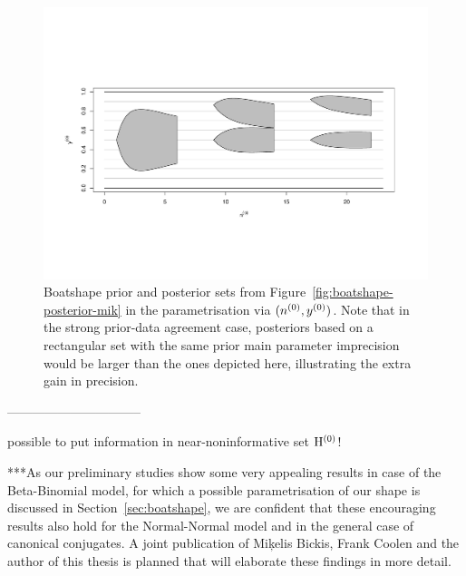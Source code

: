 \begin{figure}  %
\centering
\includegraphics[trim = 15mm 45mm 25mm 60mm, clip, width=\textwidth]{R/boatshape-posterior-normal}
\caption[Boatshape prior and posterior sets from Figure~\ref{fig:boatshape-posterior-mik} in the parametrisation via $(\nz,\yz)$.]%
{Boatshape prior and posterior sets from Figure~\ref{fig:boatshape-posterior-mik} in the parametrisation via $(\nz,\yz)$.
Note that in the strong prior-data agreement case,
posteriors based on a rectangular set with the same prior main parameter imprecision
would be larger than the ones depicted here, illustrating the extra gain in precision.}
\label{fig:boatshape-posterior-normal}
\end{figure}


--------------------------------


possible to put information in near-noninformative set $\mathrm{H}^{(0)}$!

***As our preliminary studies show some very appealing results in case of the Beta-Binomial model,
for which a possible parametrisation of our shape is discussed in Section~\ref{sec:boatshape},
we are confident that these encouraging results also hold for the Normal-Normal model
and in the general case of canonical conjugates.
A joint publication of Mi\c{k}elis Bickis, Frank Coolen and the author of this thesis is planned
that will elaborate these findings in more detail.





%
